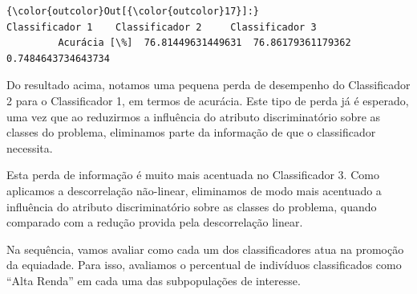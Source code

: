 \documentclass[11pt]{article}
\begin{document}
\begin{Verbatim}[commandchars=\\\{\}]
{\color{outcolor}Out[{\color{outcolor}17}]:}                 Classificador 1    Classificador 2     Classificador 3
         Acurácia [\%]  76.81449631449631  76.86179361179362  0.7484643734643734
\end{Verbatim}
            
    Do resultado acima, notamos uma pequena perda de desempenho do
Classificador 2 para o Classificador 1, em termos de acurácia. Este tipo
de perda já é esperado, uma vez que ao reduzirmos a influência do
atributo discriminatório sobre as classes do problema, eliminamos parte
da informação de que o classificador necessita.

Esta perda de informação é muito mais acentuada no Classificador 3. Como
aplicamos a descorrelação não-linear, eliminamos de modo mais acentuado
a influência do atributo discriminatório sobre as classes do problema,
quando comparado com a redução provida pela descorrelação linear.

Na sequência, vamos avaliar como cada um dos classificadores atua na
promoção da equiadade. Para isso, avaliamos o percentual de indivíduos
classificados como ``Alta Renda'' em cada uma das subpopulações de
interesse.
\end{document}
